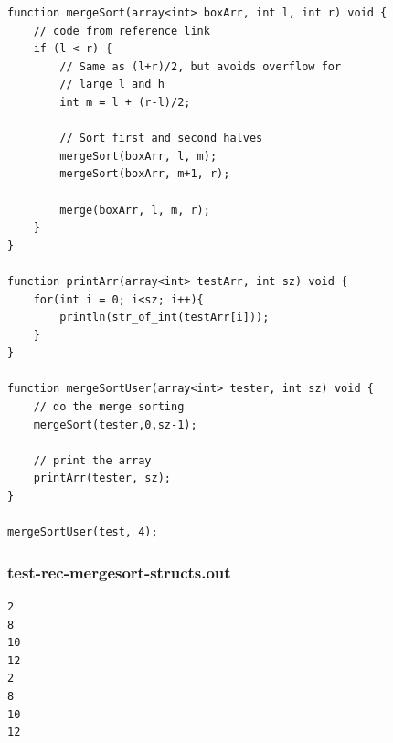 \documentclass[12pt]{article}
\begin{document}
\begin{mdframed}[hidealllines=true,backgroundcolor=blue!10]
\begin{lstlisting}
function mergeSort(array<int> boxArr, int l, int r) void {
	// code from reference link
	if (l < r) { 
        // Same as (l+r)/2, but avoids overflow for 
        // large l and h 
        int m = l + (r-l)/2; 
  
        // Sort first and second halves 
        mergeSort(boxArr, l, m); 
        mergeSort(boxArr, m+1, r); 
  
        merge(boxArr, l, m, r); 
    } 
}

function printArr(array<int> testArr, int sz) void {
	for(int i = 0; i<sz; i++){
		println(str_of_int(testArr[i]));
	}
}

function mergeSortUser(array<int> tester, int sz) void {
	// do the merge sorting
	mergeSort(tester,0,sz-1);

	// print the array
	printArr(tester, sz);
}

mergeSortUser(test, 4);\end{lstlisting}
\end{mdframed}
\subsubsection{test-rec-mergesort-structs.out}
\begin{mdframed}[hidealllines=true,backgroundcolor=green!10]
\begin{lstlisting}
2
8
10
12
2
8
10
12
\end{lstlisting}
\end{mdframed}
\end{document}
